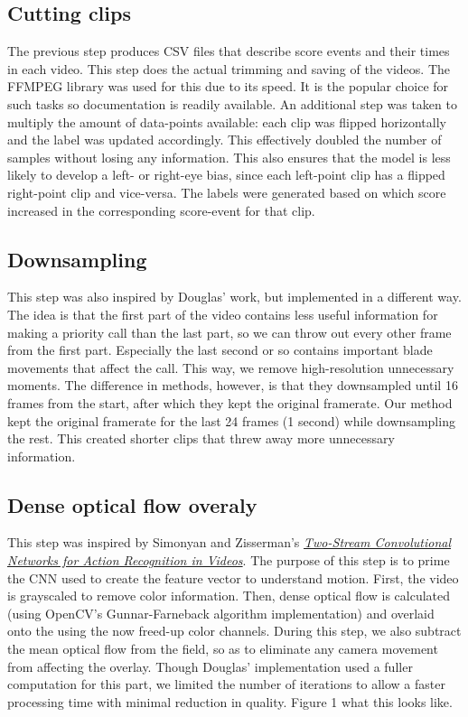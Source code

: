 \documentclass[10pt,twocolumn,letterpaper]{article}
\begin{document}
\subsection{Cutting clips}

The previous step produces CSV files that describe score events and their times in each video.
This step does the actual trimming and saving of the videos.
The FFMPEG library was used for this due to its speed.
It is the popular choice for such tasks so documentation is readily available.
An additional step was taken to multiply the amount of data-points available:
each clip was flipped horizontally and the label was updated accordingly.
This effectively doubled the number of samples without losing any information.
This also ensures that the model is less likely to develop a left- or right-eye bias, since each left-point clip has a flipped right-point clip and vice-versa.
The labels were generated based on which score increased in the corresponding score-event for that clip.

\subsection{Downsampling}

This step was also inspired by Douglas' work, but implemented in a different way.
The idea is that the first part of the video contains less useful information for making a priority call than the last part, so we can throw out every other frame from the first part.
Especially the last second or so contains important blade movements that affect the call.
This way, we remove high-resolution unnecessary moments.
The difference in methods, however, is that they downsampled until 16 frames from the start, after which they kept the original framerate.
Our method kept the original framerate for the last 24 frames (1 second) while downsampling the rest.
This created shorter clips that threw away more unnecessary information.

\subsection{Dense optical flow overaly}

This step was inspired by Simonyan and Zisserman's \href{https://arxiv.org/abs/1406.2199}{\textit{Two-Stream Convolutional Networks for Action Recognition in Videos}}.
The purpose of this step is to prime the CNN used to create the feature vector to understand motion.
First, the video is grayscaled to remove color information.
Then, dense optical flow is calculated (using OpenCV's Gunnar-Farneback algorithm implementation) and overlaid onto the using the now freed-up color channels.
During this step, we also subtract the mean optical flow from the field, so as to eliminate any camera movement from affecting the overlay.
Though Douglas' implementation used a fuller computation for this part, we limited the number of iterations to allow a faster processing time with minimal reduction in quality.
Figure 1 what this looks like.
\end{document}
